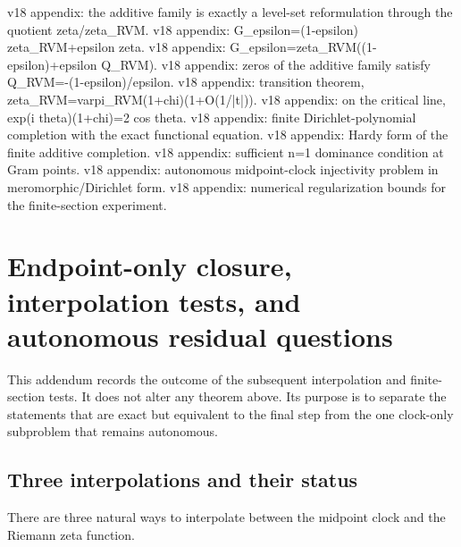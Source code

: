\documentclass[11pt,reqno]{amsart}
\numberwithin{equation}{section}
\theoremstyle{plain}
\theoremstyle{definition}
\theoremstyle{remark}
\begin{document}
\clearpage
\makeatletter
\expandafter\gdef\csname CGTip@prop:additive-level-v18\endcsname{v18 appendix: the additive family is exactly a level-set reformulation through the quotient zeta/zeta_RVM.}
\expandafter\gdef\csname CGTip@eq:additive-family-v18\endcsname{v18 appendix: G_epsilon=(1-epsilon) zeta_RVM+epsilon zeta.}
\expandafter\gdef\csname CGTip@eq:additive-level-v18\endcsname{v18 appendix: G_epsilon=zeta_RVM((1-epsilon)+epsilon Q_RVM).}
\expandafter\gdef\csname CGTip@eq:Q-negative-level-v18\endcsname{v18 appendix: zeros of the additive family satisfy Q_RVM=-(1-epsilon)/epsilon.}
\expandafter\gdef\csname CGTip@eq:rvm-first-rs-v18\endcsname{v18 appendix: transition theorem, zeta_RVM=varpi_RVM(1+chi)(1+O(1/|t|)).}
\expandafter\gdef\csname CGTip@eq:first-rs-hardy-v18\endcsname{v18 appendix: on the critical line, exp(i theta)(1+chi)=2 cos theta.}
\expandafter\gdef\csname CGTip@eq:finite-additive-v18\endcsname{v18 appendix: finite Dirichlet-polynomial completion with the exact functional equation.}
\expandafter\gdef\csname CGTip@eq:finite-additive-hardy-v18\endcsname{v18 appendix: Hardy form of the finite additive completion.}
\expandafter\gdef\csname CGTip@eq:dominance-v18\endcsname{v18 appendix: sufficient n=1 dominance condition at Gram points.}
\expandafter\gdef\csname CGTip@eq:clock-injectivity-v18\endcsname{v18 appendix: autonomous midpoint-clock injectivity problem in meromorphic/Dirichlet form.}
\expandafter\gdef\csname CGTip@eq:bounded-section-v18\endcsname{v18 appendix: numerical regularization bounds for the finite-section experiment.}
\makeatother
\section{Endpoint-only closure, interpolation tests, and autonomous residual questions}\label{sec:appendix-endpoint-v18}
\label{sec:v18-addendum}

This addendum records the outcome of the subsequent interpolation and finite-section tests.  It does not alter any theorem above.  Its purpose is to separate the statements that are exact but equivalent to the final step from the one clock-only subproblem that remains autonomous.

\subsection{Three interpolations and their status}\label{subsec:three-interpolations-v18}

There are three natural ways to interpolate between the midpoint clock and the Riemann zeta function.
\end{document}
